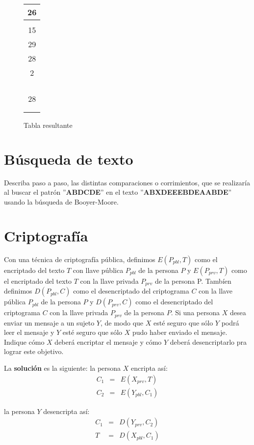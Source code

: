 \begin{figure}[H]
  \centering
  \begin{tabular}{|c|}
    \hline
    26\\
    \hline
    \\
    \hline
    15\\
    \hline
    29\\
    \hline
    28\\
    \hline
    2\\
    \hline
    \\
    \hline
    \\
    \hline
    \\
    \hline
    \\
    \hline
    28\\
    \hline
    \\
    \hline
    \\
    \hline
  \end{tabular}
  \caption{Tabla resultante}
\end{figure}

\section{Búsqueda de texto}

Describa paso a paso, las distintas comparaciones o corrimientos, que
se realizaría al buscar el patrón ''\textbf{ABDCDE}'' en el texto
''\textbf{ABXDEEEBDEAABDE}'' usando la búsqueda de Booyer-Moore.

\section{Criptografía}

Con una técnica de criptografía pública, definimos $E(P_{pbl},T)$ como
el encriptado del texto $T$ con llave pública $P_{pbl}$ de la persona
$P$ y $E(P_{prv},T)$ como el encriptado del texto $T$ con la llave
privada $P_{prv}$ de la persona P. Tambíen definimos $D(P_{pbl},C)$
como el desencriptado del criptograma $C$ con la llave pública
$P_{pbl}$ de la persona $P$ y $D(P_{prv},C)$ como el desencriptado del
criptograma $C$ con la llave privada $P_{prv}$ de la persona $P$. Si
una persona $X$ desea enviar un mensaje a un sujeto $Y$, de modo que
$X$ esté seguro que sólo $Y$ podrá leer el mensaje y $Y$ esté seguro
que sólo $X$ pudo haber enviado el mensaje. Indique cómo $X$ deberá
encriptar el mensaje y cómo $Y$ deberá desencriptarlo pra lograr este
objetivo.

La \textbf{solución} es la siguiente: la persona $X$ encripta así:
\begin{eqnarray*}
  C_1&=& E(X_{prv},T)\\
  C_2&=&E(Y_{pbl},C_1)
\end{eqnarray*}

la persona $Y$ desencripta así:
\begin{eqnarray*}
  C_1&=& D(Y_{prv},C_2)\\
  T&=&D(X_{pbl},C_1)
\end{eqnarray*}

